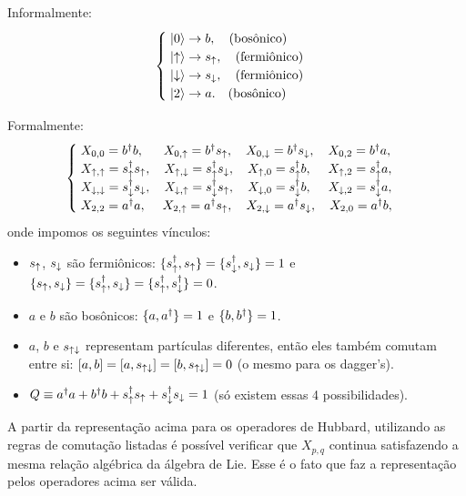 \documentclass[a4paper,fleqn,12pt]{article}
\begin{document}
Informalmente:
$$
\begin{cases}
\; \ket{0} \to b, \quad \text{(bosônico)} \\
\; \ket{\uparrow} \to s_\uparrow, \quad \text{(fermiônico)} \\
\; \ket{\downarrow} \to s_\downarrow, \quad \text{(fermiônico)} \\
\; \ket{2} \to a. \quad \text{(bosônico)}
\end{cases}
$$

Formalmente:
$$
\begin{cases}
\; X_{0,0} = b^\dagger b, \quad \;\; X_{0, \uparrow} = b^\dagger s_\uparrow,
 \quad X_{0, \downarrow} = b^\dagger s_\downarrow, \quad X_{0, 2} = b^\dagger a, \\
\; X_{\uparrow,\uparrow} = s_\uparrow^\dagger s_\uparrow, \quad X_{\uparrow, \downarrow} = s_\uparrow^\dagger s_\downarrow,
 \quad X_{\uparrow, 0} = s_\uparrow^\dagger b, \quad \; X_{\uparrow, 2} = s_\uparrow^\dagger a, \\
\; X_{\downarrow,\downarrow} = s_\downarrow^\dagger s_\downarrow, \quad X_{\downarrow, \uparrow} = s_\downarrow^\dagger s_\uparrow,
 \quad X_{\downarrow, 0} = s_\downarrow^\dagger b, \quad \; X_{\downarrow, 2} = s_\downarrow^\dagger a, \\
\; X_{2,2} = a^\dagger a, \quad \; X_{2, \uparrow} = a^\dagger s_\uparrow,
 \quad X_{2, \downarrow} = a^\dagger s_\downarrow, \quad X_{2, 0} = a^\dagger b,
\end{cases}
$$
onde impomos os seguintes vínculos:
\begin{itemize}
\item $s_\uparrow$, $s_\downarrow$ são fermiônicos: $\{s_\uparrow^\dagger, s_\uparrow\} = \{s_\downarrow^\dagger, s_\downarrow\} = 1$ e $\{s_\uparrow, s_\downarrow\} = \{s_\uparrow^\dagger, s_\downarrow\} = \{s_\uparrow^\dagger, s_\downarrow^\dagger\} = 0$.
\item $a$ e $b$ são bosônicos: $\{a,a^\dagger\} =1$ e $\{b, b^\dagger\} = 1$.
\item $a$, $b$ e $s_{\uparrow\downarrow}$ representam partículas diferentes, então eles também comutam entre si: $[a, b] = [a, s_{\uparrow\downarrow}] = [b, s_{\uparrow\downarrow}] = 0$ (o mesmo para os dagger's).
\item $Q \equiv a^\dagger a + b^\dagger b + s_\uparrow^\dagger s_\uparrow + s_\downarrow^\dagger s_\downarrow = 1$ (só existem essas 4 possibilidades).
\end{itemize}

A partir da representação acima para os operadores de Hubbard, utilizando as regras de comutação listadas é possível verificar que $X_{p,q}$ continua satisfazendo a mesma relação algébrica da álgebra de Lie. Esse é o fato que faz a representação pelos operadores acima ser válida.
\end{document}
